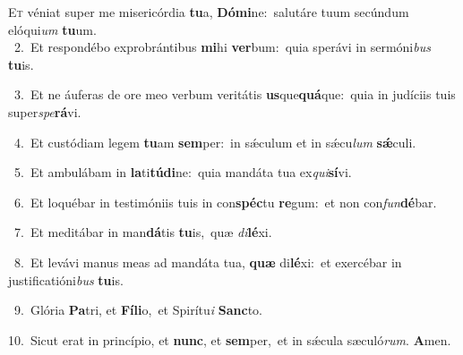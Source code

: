 \lettrine{\initial\textcolor{\initialcolor}{E}}{t} véniat super me misericórdia \textbf{tu}\-a, \textbf{Dó}\-\textbf{mi}ne:~\star salutáre tuum secúndum elóqui\textit{um} \textbf{tu}\-um.\\
{\numbfont\textcolor{\numbcolor}{~2.}}~Et respondébo exprobrántibus \textbf{mi}\-hi \textbf{ver}\-bum:~\star quia sperávi in sermóni\textit{bus} \textbf{tu}\-is.\par
{\numbfont\textcolor{\numbcolor}{~3.}}~Et ne áuferas de ore meo verbum veritátis \textbf{us}\-que\-\textbf{quá}\-que:~\star quia in judíciis tuis super\-\textit{spe}\-\textbf{rá}vi.\par
{\numbfont\textcolor{\numbcolor}{~4.}}~Et custódiam legem \textbf{tu}\-am \textbf{sem}\-per:~\star in sǽculum et in sǽcu\textit{lum} \textbf{sǽ}\-culi.\par
{\numbfont\textcolor{\numbcolor}{~5.}}~Et ambulábam in \textbf{la}\-ti\-\textbf{tú}\-\textbf{di}ne:~\star quia mandáta tua ex\-\textit{qui}\-\textbf{sí}vi.\par
{\numbfont\textcolor{\numbcolor}{~6.}}~Et loquébar in testimóniis tuis in con\-\textbf{spéc}\-tu \textbf{re}\-gum:~\star et non con\-\textit{fun}\-\textbf{dé}bar.\par
{\numbfont\textcolor{\numbcolor}{~7.}}~Et meditábar in man\-\textbf{dá}\-tis \textbf{tu}\-is,~\star quæ \textit{di}\-\textbf{lé}xi.\par
{\numbfont\textcolor{\numbcolor}{~8.}}~Et levávi manus meas ad mandáta tua, \textbf{quæ} di\-\textbf{lé}\-xi:~\star et exercébar in justificatióni\textit{bus} \textbf{tu}\-is.\par
{\numbfont\textcolor{\numbcolor}{~9.}}~Glória \textbf{Pa}\-tri, et \textbf{Fí}\-\textbf{li}o,~\star et Spirítu\textit{i} \textbf{Sanc}\-to.\par
{\numbfont\textcolor{\numbcolor}{10.}}~Sicut erat in princípio, et \textbf{nunc}\-, et \textbf{sem}\-per,~\star et in sǽcula sæculó\-\textit{rum}\-. \textbf{A}\-men.\par
